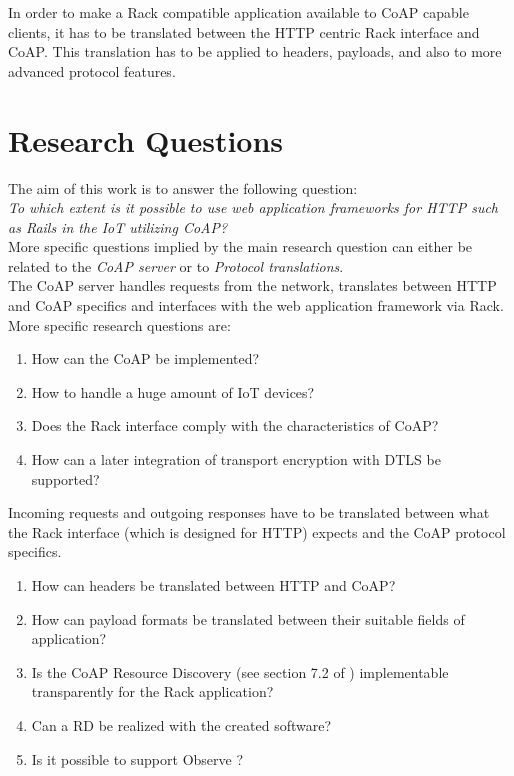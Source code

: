 		In order to make a Rack compatible application available to \ac{CoAP}
		capable clients, it has to be translated between the \ac{HTTP} centric
		Rack interface and \ac{CoAP}. This translation has to be applied to
		headers, payloads, and also to more advanced protocol features.

\section{Research Questions}
	\label{cha:intro:questions}

	The aim of this work is to answer the following question:\\

	\emph{To which extent is it possible to use web application frameworks for
	\acs{HTTP} such as \acl{Rails} in the \acl{IoT} utilizing \acs{CoAP}?}\\

	\noindent
	More specific questions implied by the main research question can either be
	related to the \emph{\ac{CoAP} server} or to \emph{Protocol
	translations}.\\

	\noindent
	The \ac{CoAP} server handles requests from the network, translates between
	\ac{HTTP} and \ac{CoAP} specifics and interfaces with the web application
	framework via Rack. More specific research questions are:

	\begin{enumerate}
		\item How can the \acf{CoAP} be implemented?
		\item How to handle a huge amount of \ac{IoT} devices?
		\item Does the Rack interface comply with the characteristics of
			\ac{CoAP}?
		\item How can a later integration of transport encryption with
			\ac{DTLS} \cite{dtls} be supported?
	\end{enumerate}

	\noindent
	Incoming requests and outgoing responses have to be translated between what
	the Rack interface (which is designed for \ac{HTTP}) expects and the
	\ac{CoAP} protocol specifics.

	\begin{enumerate}
		\item How can headers be translated between \ac{HTTP} and \ac{CoAP}?
		\item How can payload formats be translated between their suitable
			fields of application?
		\item Is the \ac{CoAP} Resource Discovery (see section 7.2 of
			\cite{coap}) implementable transparently for the Rack application?
		\item Can a \acf{RD} \cite{rd} be realized with the created software?
		\item Is it possible to support Observe \cite{observe}?
	\end{enumerate}
